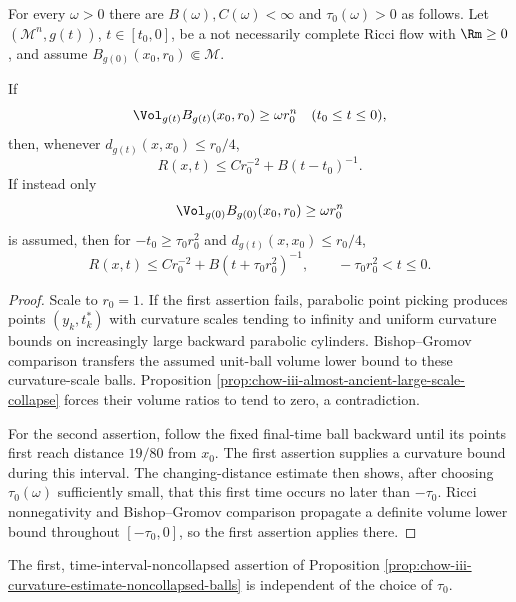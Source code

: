 \begin{proposition}
\label{prop:chow-iii-curvature-estimate-noncollapsed-balls}
For every $\omega>0$ there are $B(\omega),C(\omega)<\infty$ and
$\tau_0(\omega)>0$ as follows.  Let $(\mathcal M^n,g(t))$,
$t\in[t_0,0]$, be a not necessarily complete Ricci flow with $\Rm\ge0$, and
assume $B_{g(0)}(x_0,r_0)\Subset\mathcal M$.

If
\[
 \Vol_{g(t)}B_{g(t)}(x_0,r_0)\ge\omega r_0^n
 \quad(t_0\le t\le0),
\]
then, whenever $d_{g(t)}(x,x_0)\le r_0/4$,
\[
 R(x,t)\le C r_0^{-2}+B(t-t_0)^{-1}.
\]
If instead only
\[
 \Vol_{g(0)}B_{g(0)}(x_0,r_0)\ge\omega r_0^n
\]
is assumed, then for $-t_0\ge\tau_0r_0^2$ and
$d_{g(t)}(x,x_0)\le r_0/4$,
\[
 R(x,t)\le C r_0^{-2}+B(t+\tau_0r_0^2)^{-1},
 \qquad -\tau_0r_0^2<t\le0.
\]
\end{proposition}
\begin{proof}
\sketch Scale to $r_0=1$.  If the first assertion fails, parabolic point picking
produces points $(y_k,t_k^*)$ with curvature scales tending to infinity and
uniform curvature bounds on increasingly large backward parabolic
cylinders.  Bishop--Gromov comparison transfers the assumed unit-ball volume
lower bound to these curvature-scale balls.  Proposition
\ref{prop:chow-iii-almost-ancient-large-scale-collapse} forces their volume
ratios to tend to zero, a contradiction.

For the second assertion, follow the fixed final-time ball backward until its
points first reach distance $19/80$ from $x_0$.  The first assertion supplies
a curvature bound during this interval.  The changing-distance estimate then
shows, after choosing $\tau_0(\omega)$ sufficiently small, that this first
time occurs no later than $-\tau_0$.  Ricci nonnegativity and Bishop--Gromov
comparison propagate a definite volume lower bound throughout
$[-\tau_0,0]$, so the first assertion applies there.
\end{proof}

\begin{remark}
\label{rem:chow-iii-curvature-estimate-time-independent}
The first, time-interval-noncollapsed assertion of Proposition
\ref{prop:chow-iii-curvature-estimate-noncollapsed-balls} is independent of
the choice of $\tau_0$.
\end{remark}


